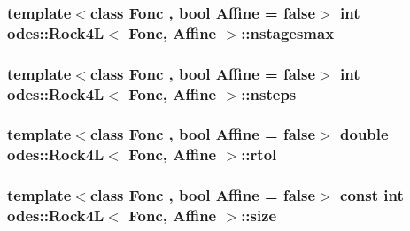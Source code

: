 \hypertarget{classodes_1_1Rock4L_a82aa0cf37dea63ba855466b6576c5af0}{
\subsubsection[{nstagesmax}]{\setlength{\rightskip}{0pt plus 5cm}template$<$class Fonc , bool Affine = false$>$ int {\bf odes\-::\-Rock4\-L}$<$ Fonc, Affine $>$\-::nstagesmax\hspace{0.3cm}{\ttfamily [private]}}}\label{classodes_1_1Rock4L_a82aa0cf37dea63ba855466b6576c5af0}
\hypertarget{classodes_1_1Rock4L_afd921758c89e6829c914447d9e654c1d}{
\subsubsection[{nsteps}]{\setlength{\rightskip}{0pt plus 5cm}template$<$class Fonc , bool Affine = false$>$ int {\bf odes\-::\-Rock4\-L}$<$ Fonc, Affine $>$\-::nsteps\hspace{0.3cm}{\ttfamily [private]}}}\label{classodes_1_1Rock4L_afd921758c89e6829c914447d9e654c1d}
\hypertarget{classodes_1_1Rock4L_a7702a7a0b70bfb0b452a3f6f5d53c9a0}{
\subsubsection[{rtol}]{\setlength{\rightskip}{0pt plus 5cm}template$<$class Fonc , bool Affine = false$>$ double {\bf odes\-::\-Rock4\-L}$<$ Fonc, Affine $>$\-::rtol\hspace{0.3cm}{\ttfamily [private]}}}\label{classodes_1_1Rock4L_a7702a7a0b70bfb0b452a3f6f5d53c9a0}
\hypertarget{classodes_1_1Rock4L_a656df90cfccb64f435ff8e0c4d49c159}{
\subsubsection[{size}]{\setlength{\rightskip}{0pt plus 5cm}template$<$class Fonc , bool Affine = false$>$ const int {\bf odes\-::\-Rock4\-L}$<$ Fonc, Affine $>$\-::size\hspace{0.3cm}{\ttfamily [private]}}}\label{classodes_1_1Rock4L_a656df90cfccb64f435ff8e0c4d49c159}
